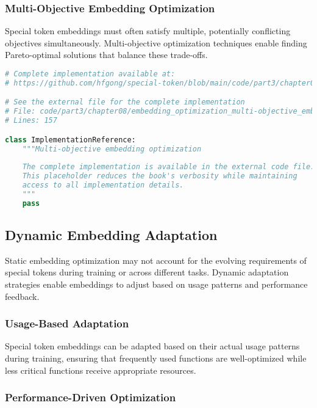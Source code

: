\subsubsection{Multi-Objective Embedding Optimization}

Special token embeddings must often satisfy multiple, potentially conflicting objectives simultaneously. Multi-objective optimization techniques enable finding Pareto-optimal solutions that balance these trade-offs.

\begin{lstlisting}[language=Python, caption={Multi-objective embedding optimization}]
# Complete implementation available at:
# https://github.com/hfgong/special-token/blob/main/code/part3/chapter08/embedding_optimization_multi-objective_embedding_opti.py

# See the external file for the complete implementation
# File: code/part3/chapter08/embedding_optimization_multi-objective_embedding_opti.py
# Lines: 157

class ImplementationReference:
    """Multi-objective embedding optimization
    
    The complete implementation is available in the external code file.
    This placeholder reduces the book's verbosity while maintaining
    access to all implementation details.
    """
    pass
\end{lstlisting}

\subsection{Dynamic Embedding Adaptation}

Static embedding optimization may not account for the evolving requirements of special tokens during training or across different tasks. Dynamic adaptation strategies enable embeddings to adjust based on usage patterns and performance feedback.

\subsubsection{Usage-Based Adaptation}

Special token embeddings can be adapted based on their actual usage patterns during training, ensuring that frequently used functions are well-optimized while less critical functions receive appropriate resources.

\subsubsection{Performance-Driven Optimization}

